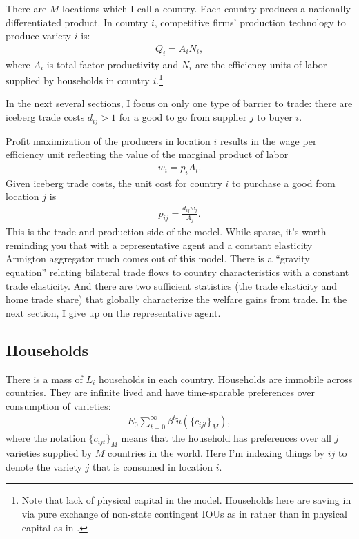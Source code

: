 \documentclass[12pt,pdftex]{article}
\begin{document}
\begin{onehalfspacing}
There are $M$ locations which I call a country. Each country produces a nationally differentiated product. In country $i$, competitive firms' production technology to produce variety $i$ is:
\begin{align}
Q_i = A_i N_i,
\label{eq:production}
\end{align}
where $A_i$ is total factor productivity and $N_i$ are the efficiency units of labor supplied by households in country $i$.\footnote{Note that lack of physical capital in the model. Households here are saving in via pure exchange of non-state contingent IOUs as in \citet{huggett1993risk} rather than in physical capital as in \citet{aiyagari1994uninsured}.}

In the next several sections, I focus on only one type of barrier to trade: there are iceberg trade costs $d_{ij} > 1$ for a good to go from supplier $j$ to buyer $i$.

Profit maximization of the producers in location $i$ results in the wage per efficiency unit reflecting the value of the marginal product of labor
\begin{align}
w_{i} = p_{i} A_{i}.
\label{eq:marginal-product}
\end{align}
Given iceberg trade costs, the unit cost for country $i$ to purchase a good from location $j$ is
\begin{align}
p_{ij} = \frac{d_{ij}w_{j}}{A_{j}}.
\label{eq:marginal-product-ship}
\end{align}
This is the trade and production side of the model. While sparse, it's worth reminding you that with a representative agent and a constant elasticity Armigton aggregator much comes out of this model. There is a ``gravity equation'' relating bilateral trade flows to country characteristics with a constant trade elasticity. And there are two sufficient statistics (the trade elasticity and home trade share) that globally characterize the welfare gains from trade. In the next section, I give up on the representative agent.

\subsection{Households}

There is a mass of $L_i$ households in each country. Households are immobile across countries. They are infinite lived and have time-sparable preferences over consumption of varieties:
\begin{align}
E_{0} \sum_{t = 0}^{\infty} \beta^{t} \tilde{u}( \{ c_{ijt} \}_{M}),
\end{align}
where the notation $\{ c_{ijt} \}_{M}$ means that the household has preferences over all $j$ varieties supplied by $M$ countries in the world. Here I'm indexing things by $ij$ to denote the variety $j$ that is consumed in location $i$.


\end{onehalfspacing}
\end{document}
